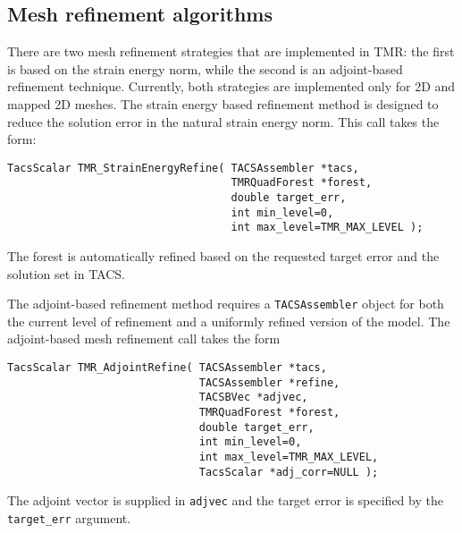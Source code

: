 \documentclass[12pt]{article}
\begin{document}
\subsection{Mesh refinement algorithms}

There are two mesh refinement strategies that are implemented in TMR: the first is based on the strain energy norm, while the second is an adjoint-based refinement technique.
Currently, both strategies are implemented only for 2D and mapped 2D meshes.
The strain energy based refinement method is designed to reduce the solution error in the natural strain energy norm.
This call takes the form:
%
\begin{verbatim}
TacsScalar TMR_StrainEnergyRefine( TACSAssembler *tacs,
                                   TMRQuadForest *forest,
                                   double target_err,
                                   int min_level=0, 
                                   int max_level=TMR_MAX_LEVEL );
\end{verbatim}
%
The forest is automatically refined based on the requested target error and the solution set in TACS.

The adjoint-based refinement method requires a \texttt{TACSAssembler} object for both the current level of refinement and a uniformly refined version of the model. 
The adjoint-based mesh refinement call takes the form
\begin{verbatim}
TacsScalar TMR_AdjointRefine( TACSAssembler *tacs,
                              TACSAssembler *refine,
                              TACSBVec *adjvec,
                              TMRQuadForest *forest,
                              double target_err,
                              int min_level=0, 
                              int max_level=TMR_MAX_LEVEL,
                              TacsScalar *adj_corr=NULL );
\end{verbatim}
The adjoint vector is supplied in \texttt{adjvec} and the target error is specified by the \texttt{target\_err} argument.



\end{document}
